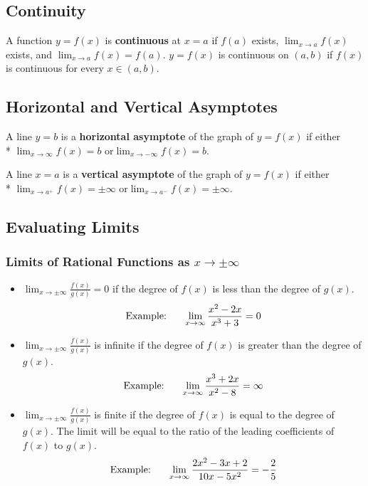 \documentclass{artikel3}
\begin{document}
\subsection{Continuity}
A function $y=f(x)$ is \textbf{continuous} at $x=a$ if $f(a)$ exists, 
$\displaystyle\lim_{x \to a}f(x)$ exists, and $\displaystyle\lim_{x \to a}f(x)=f(a)$.
$y=f(x)$ is continuous on $(a,b)$ if $f(x)$ is continuous for every
$x\in(a,b)$.

\subsection{Horizontal and Vertical Asymptotes}
A line $y=b$ is a \textbf{horizontal asymptote} of the graph of $y=f(x)$ if either\\*
$\displaystyle\lim_{x \to \infty}f(x)=b \text{ or} \lim_{x \to -\infty}f(x)=b$.

A line $x=a$ is a \textbf{vertical asymptote} of the graph of $y=f(x)$ if either\\*
$\displaystyle\lim_{x \to a^+}f(x)=\pm\infty \text{ or} \lim_{x \to a^-}f(x)=\pm\infty$.

\subsection{Evaluating Limits}

\subsubsection{Limits of Rational Functions as $x \to \pm\infty$}
\begin{itemize}
\item{$\displaystyle\lim_{x \to \pm\infty}\frac{f(x)}{g(x)}=0$ if the degree
of $f(x)$ is less than the degree of $g(x)$.
\[ \text{Example:}\hspace{6 mm}\lim_{x \to \infty}\frac{x^2-2x}{x^3+3}=0 \]}
\item{$\displaystyle\lim_{x \to \pm\infty}\frac{f(x)}{g(x)}$ is infinite if the degree
of $f(x)$ is greater than the degree of $g(x)$.
\[ \text{Example:}\hspace{6 mm}\lim_{x \to \infty}\frac{x^3+2x}{x^2-8}=\infty \]}
\item{$\displaystyle\lim_{x \to \pm\infty}\frac{f(x)}{g(x)}$ is finite if the degree 
of $f(x)$ is equal to the degree of $g(x)$. The limit will be equal to the ratio of 
the leading coefficients of $f(x)$ to $g(x)$.
\[ \text{Example:}\hspace{6 mm}\lim_{x \to \infty}\frac{2x^2-3x+2}{10x-5x^2}=-\frac{2}{5} \]}
\end{itemize}
\end{document}
